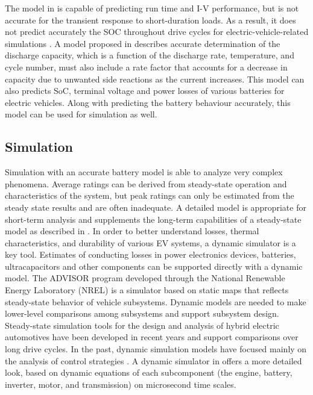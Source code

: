 The model in \cite{ZS_chen} is capable of predicting run time and I-V performance, but is not
accurate for the transient response to short-duration loads. As a result, it does not predict accurately
the SOC throughout drive cycles for electric-vehicle-related simulations \cite{ZS_kro}. A model proposed in \cite{ZS_kro} describes accurate determination of the discharge capacity, which is a function of the discharge rate, temperature, and cycle number, must also include a rate factor that accounts
for a decrease in capacity due to unwanted side reactions
 as the current increases. This model can also predicts SoC, terminal voltage and power losses of various batteries for electric vehicles. Along with predicting the battery behaviour accurately, this model can be used for simulation as well. 
 
\subsection{Simulation}

Simulation with an accurate battery model is able to analyze very complex phenomena. Average ratings can be
derived from steady-state operation and characteristics of the
system, but peak ratings can only be estimated from the steady state results and are often inadequate. A detailed model is appropriate for short-term
analysis and supplements the long-term capabilities of a
steady-state model as described in \cite{ZS_wip,ZS_adv}.  In order to better understand losses, thermal
characteristics, and durability of various  EV systems, a
dynamic simulator is a key tool. Estimates of conducting losses in
power electronics devices, batteries, ultracapacitors and other
components can be supported directly with a dynamic model. The ADVISOR program developed through the National Renewable Energy
Laboratory (NREL) \cite{ZS_bai} is a simulator based on static
maps that reflects steady-state behavior of vehicle
subsystems. Dynamic models are needed to make lower-level comparisons
among subsystems and support subsystem design. Steady-state simulation tools for the design and analysis of
hybrid electric automotives have been developed in recent years and support comparisons over long drive cycles. In the past, dynamic
simulation models have focused mainly on the analysis of
control strategies \cite{ZS_amr}. A dynamic simulator in \cite{ZS_log} offers a more
detailed look, based on dynamic equations of each
subcomponent (the engine, battery, inverter, motor, and
transmission) on microsecond time scales.

